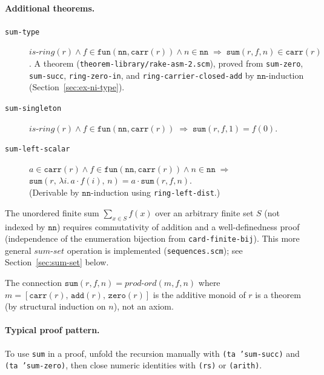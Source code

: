 \paragraph{Additional theorems.}
\begin{description}
\item[\texttt{sum-type}]
  $\mathit{is\text{-}ring}(r) \wedge f \in \mathtt{fun}(\mathtt{nn}, \mathtt{carr}(r))
  \wedge n \in \mathtt{nn} \;\Rightarrow\; \mathtt{sum}(r, f, n) \in \mathtt{carr}(r)$.
  A theorem (\texttt{theorem-library/rake-asm-2.scm}), proved from
  \texttt{sum-zero}, \texttt{sum-succ}, \texttt{ring-zero-in},
  and \texttt{ring-carrier-closed-add} by $\mathtt{nn}$-induction
  (Section~\ref{sec:ex-ni-type}).

\item[\texttt{sum-singleton}]
  $\mathit{is\text{-}ring}(r) \wedge f \in \mathtt{fun}(\mathtt{nn}, \mathtt{carr}(r))
  \;\Rightarrow\; \mathtt{sum}(r, f, 1) = f(0)$.

\item[\texttt{sum-left-scalar}]
  $a \in \mathtt{carr}(r) \wedge f \in \mathtt{fun}(\mathtt{nn}, \mathtt{carr}(r))
  \wedge n \in \mathtt{nn} \;\Rightarrow\;$\\
  $\mathtt{sum}(r,\, \lambda i.\, a \cdot f(i),\, n)
  = a \cdot \mathtt{sum}(r, f, n)$.\\
  (Derivable by $\mathtt{nn}$-induction using \texttt{ring-left-dist}.)
\end{description}

\begin{remark}
The unordered finite sum $\sum_{x \in S} f(x)$ over an arbitrary finite
set $S$ (not indexed by $\mathtt{nn}$) requires commutativity of
addition and a well-definedness proof (independence of the enumeration
bijection from \texttt{card-finite-bij}).  This more general
$\mathit{sum\text{-}set}$ operation is implemented (\texttt{sequences.scm}); see
Section~\ref{sec:sum-set} below.
\end{remark}

\begin{remark}
The connection $\mathtt{sum}(r, f, n) = \mathit{prod\text{-}ord}(m, f, n)$
where $m = [\mathtt{carr}(r),\, \mathtt{add}(r),\, \mathtt{zero}(r)]$ is the
additive monoid of $r$ is a theorem (by structural induction on $n$),
not an axiom.
\end{remark}

\paragraph{Typical proof pattern.}
To use \texttt{sum} in a proof, unfold the recursion manually with
\texttt{(ta 'sum-succ)} and \texttt{(ta 'sum-zero)}, then close
numeric identities with \texttt{(rs)} or \texttt{(arith)}.

